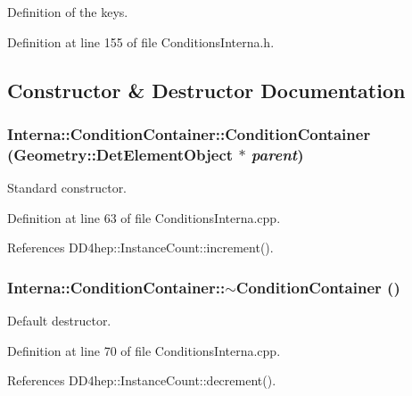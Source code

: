 Definition of the keys. 

Definition at line 155 of file ConditionsInterna.h.

\subsection{Constructor \& Destructor Documentation}
\hypertarget{class_d_d4hep_1_1_conditions_1_1_interna_1_1_condition_container_a766c849d73bfff4a401fc002a75c7594}{
\subsubsection[{ConditionContainer}]{\setlength{\rightskip}{0pt plus 5cm}Interna::ConditionContainer::ConditionContainer ({\bf Geometry::DetElementObject} $\ast$ {\em parent})}}
\label{class_d_d4hep_1_1_conditions_1_1_interna_1_1_condition_container_a766c849d73bfff4a401fc002a75c7594}


Standard constructor. 

Definition at line 63 of file ConditionsInterna.cpp.

References DD4hep::InstanceCount::increment().\hypertarget{class_d_d4hep_1_1_conditions_1_1_interna_1_1_condition_container_a18cfd1f77eea4ae5fdf3a46ed8aa61ea}{
\subsubsection[{$\sim$ConditionContainer}]{\setlength{\rightskip}{0pt plus 5cm}Interna::ConditionContainer::$\sim$ConditionContainer ()}}
\label{class_d_d4hep_1_1_conditions_1_1_interna_1_1_condition_container_a18cfd1f77eea4ae5fdf3a46ed8aa61ea}


Default destructor. 

Definition at line 70 of file ConditionsInterna.cpp.

References DD4hep::InstanceCount::decrement().

